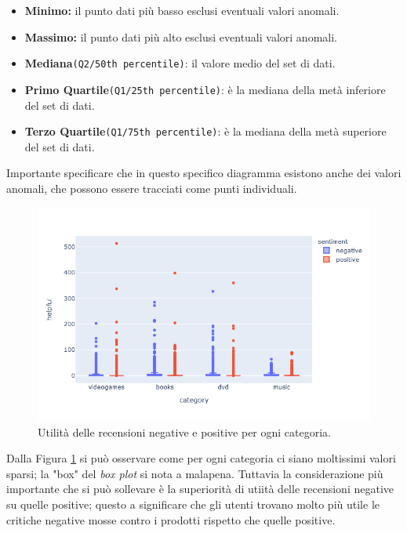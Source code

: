 			\begin{itemize}
				\item \textbf{Minimo:} il punto dati più basso esclusi eventuali valori anomali.
				\item \textbf{Massimo:} il punto dati più alto esclusi eventuali valori anomali.
				\item \textbf{Mediana}\verb|(Q2/50th percentile)|: il valore medio del set di dati.
				\item \textbf{Primo Quartile}\verb|(Q1/25th percentile)|: è la mediana della metà inferiore del set di dati.
				\item \textbf{Terzo Quartile}\verb|(Q1/75th percentile)|: è la mediana della metà superiore del set di dati.
			\end{itemize} 
		
			Importante specificare che in questo specifico diagramma esistono anche dei valori anomali, che possono essere tracciati come punti individuali. \\
				
			\begin{figure}
				\includegraphics[width=\textwidth]{Figure/boxplot-ratingVShelpful}	
				\caption{Utilità delle recensioni negative e positive per ogni categoria.}
				\label{fig:boxplot-ratingVShelpful}
			\end{figure}
			
			Dalla Figura \ref{fig:boxplot-ratingVShelpful} si può osservare come per ogni categoria ci siano moltissimi valori sparsi; la "box" del \textit{box plot} si nota a malapena. Tuttavia la considerazione più importante che si può sollevare è la superiorità di utiità delle recensioni negative su quelle positive; questo a significare che gli utenti trovano molto più utile le critiche negative mosse contro i prodotti rispetto che quelle positive.
			
		
		
		